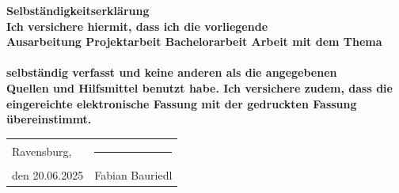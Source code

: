 \thispagestyle{empty}
\begin{center}
    \vspace*{1cm}
    \Huge\bf Selbständigkeitserklärung\\
    \vspace*{2cm}
    \large\normalfont\singlespacing 
    Ich versichere hiermit, dass ich die vorliegende\\ \ifcase\myType Ausarbeitung \or Projektarbeit \or Bachelorarbeit \else Arbeit \fi mit dem Thema\\
    \vspace*{1cm}
    \Large\bf\myTopic\\
    \Large\normalfont\mySubTopic
    \vspace*{1cm}
    \large\normalfont
    \singlespacing 
    selbständig verfasst und keine anderen als die angegebenen\\Quellen und Hilfsmittel benutzt habe. Ich versichere zudem, 
    dass die eingereichte elektronische Fassung 
    mit der gedruckten Fassung übereinstimmt.\\
    \vfill
    \renewcommand{\arraystretch}{1.5} %
    \begin{tabularx}{\textwidth}{l@{\extracolsep\fill}r}
        Ravensburg,
        & \rule{7.55cm}{0.3mm} \\[-0.2cm] %
        den 20.06.2025
        & Fabian Bauriedl \\[0.7cm]
    \end{tabularx}
\end{center}
